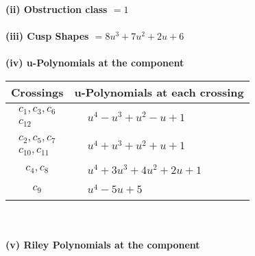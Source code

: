 \documentclass[1p]{elsarticle_modified}
\theoremstyle{definition}
\begin{document}
\flushleft \textbf{(ii) Obstruction class $= 1$}\\~\\
\flushleft \textbf{(iii) Cusp Shapes $= 8 u^3+7 u^2+2 u+6$}\\~\\
\newpage\renewcommand{\arraystretch}{1}
\flushleft \textbf{(iv) u-Polynomials at the component}\newline \\
\begin{tabular}{m{50pt}|m{274pt}}
Crossings & \hspace{64pt}u-Polynomials at each crossing \\
\hline $$\begin{aligned}c_{1},c_{3},c_{6}\\c_{12}\end{aligned}$$&$\begin{aligned}
&u^4- u^3+u^2- u+1
\end{aligned}$\\
\hline $$\begin{aligned}c_{2},c_{5},c_{7}\\c_{10},c_{11}\end{aligned}$$&$\begin{aligned}
&u^4+u^3+u^2+u+1
\end{aligned}$\\
\hline $$\begin{aligned}c_{4},c_{8}\end{aligned}$$&$\begin{aligned}
&u^4+3 u^3+4 u^2+2 u+1
\end{aligned}$\\
\hline $$\begin{aligned}c_{9}\end{aligned}$$&$\begin{aligned}
&u^4-5 u+5
\end{aligned}$\\
\hline
\end{tabular}\\~\\
\newpage\renewcommand{\arraystretch}{1}
\flushleft \textbf{(v) Riley Polynomials at the component}\newline \\
\end{document}
